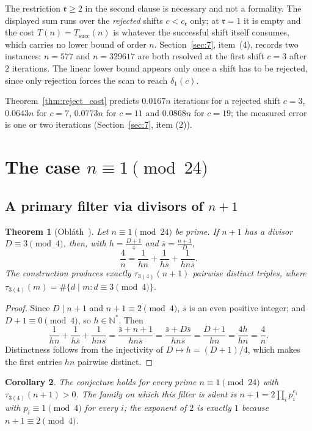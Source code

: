 \documentclass[11pt, a4paper]{article}
\theoremstyle{plain}
\newtheorem{theorem}{Theorem}[section]
\newtheorem{corollary}[theorem]{Corollary}
\theoremstyle{definition}
\newcommand{\N}{\mathbb{N}}
\begin{document}
The restriction $\mathfrak r\ge2$ in the second clause is necessary and not a formality. The displayed sum runs over the \emph{rejected} shifts $c<c_{\mathfrak r}$ only; at $\mathfrak r=1$ it is empty and the cost $T(n)=T_{\mathrm{succ}}(n)$ is whatever the successful shift itself consumes, which carries no lower bound of order $n$. Section~\ref{sec:7}, item~(4), records two instances: $n=577$ and $n=329617$ are both resolved at the first shift $c=3$ after $2$ iterations. The linear lower bound appears only once a shift has to be rejected, since only rejection forces the scan to reach $\delta_1(c)$.

Theorem~\ref{thm:reject_cost} predicts $0.0167n$ iterations for a rejected shift $c=3$, $0.0643n$ for $c=7$, $0.0773n$ for $c=11$ and $0.0868n$ for $c=19$; the measured error is one or two iterations (Section~\ref{sec:7}, item (2)).

\section{The case $n \equiv 1 \pmod{24}$} \label{sec:case_n1_mod24}

\subsection{A primary filter via divisors of $n+1$} \label{subsec:filter_n1}

\begin{theorem}[Obl\'{a}th~\cite{oblath1950}] \label{thm:4.1}
Let $n \equiv 1 \pmod{24}$ be prime. If $n+1$ has a divisor $D \equiv 3 \pmod{4}$, then, with $h = \frac{D+1}{4}$ and $\bar{s} = \frac{n+1}{D}$,
$$ \frac{4}{n} = \frac{1}{hn} + \frac{1}{h\bar{s}} + \frac{1}{hn\bar{s}}. $$
The construction produces exactly $\tau_{3(4)}(n+1)$ pairwise distinct triples, where $\tau_{3(4)}(m)=\#\{d\mid m: d\equiv3\pmod4\}$.
\end{theorem}
\begin{proof}
Since $D \mid n+1$ and $n+1 \equiv 2 \pmod{4}$, $\bar{s}$ is an even positive integer; and $D+1 \equiv 0 \pmod{4}$, so $h \in \N^*$. Then
$$ \frac{1}{hn} + \frac{1}{h\bar{s}} + \frac{1}{hn\bar{s}} = \frac{\bar{s}+n+1}{hn\bar{s}} = \frac{\bar{s}+D\bar{s}}{hn\bar{s}} = \frac{D+1}{hn} = \frac{4h}{hn} = \frac{4}{n}. $$
Distinctness follows from the injectivity of $D\mapsto h=(D+1)/4$, which makes the first entries $hn$ pairwise distinct.
\end{proof}

\begin{corollary} \label{cor:4.3}
The conjecture holds for every prime $n \equiv 1 \pmod{24}$ with $\tau_{3(4)}(n+1) > 0$. The family on which this filter is silent is $n+1 = 2\prod_i p_i^{e_i}$ with $p_i \equiv 1 \pmod{4}$ for every $i$; the exponent of $2$ is exactly $1$ because $n+1\equiv2\pmod4$.
\end{corollary}
\end{document}

